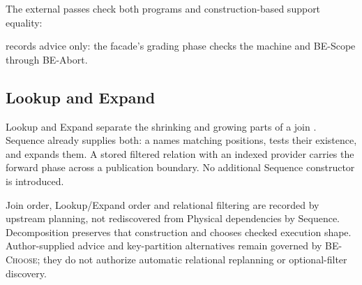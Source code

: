 The external  passes check both programs and
construction-based support equality:
\begin{mathpar}





\end{mathpar}
 records advice only: the facade's grading phase checks the
machine and BE-Scope through BE-Abort.

\subsection{Lookup and Expand}
\label{sec:lookup-expand}
Lookup and Expand separate the shrinking and growing parts of a join
\cite[Sections~3.2--3.4 and~4]{paper-diamond}.
Sequence already supplies both: a  names matching positions,
 tests their existence, and  expands
them. A stored filtered relation with an indexed provider carries the
forward phase across a publication boundary. No additional Sequence
constructor is introduced.

Join order, Lookup/Expand order and relational filtering are recorded by
upstream planning, not rediscovered from Physical dependencies by Sequence.
Decomposition preserves that construction and chooses checked execution shape.
Author-supplied  advice and key-partition alternatives remain
governed by \textsc{BE-Choose}; they do not authorize automatic relational
replanning or optional-filter discovery.

